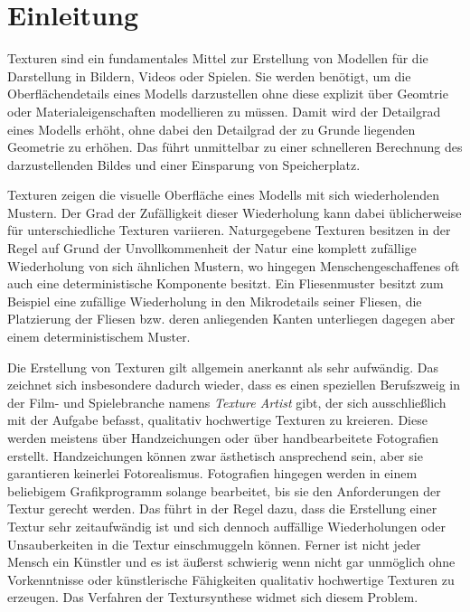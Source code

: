 \section{Einleitung}

Texturen sind ein fundamentales Mittel zur Erstellung von Modellen für die Darstellung in Bildern, Videos oder Spielen.
Sie werden benötigt, um die Oberflächendetails eines Modells darzustellen ohne diese explizit über Geomtrie oder Materialeigenschaften modellieren zu müssen.
Damit wird der Detailgrad eines Modells erhöht, ohne dabei den Detailgrad der zu Grunde liegenden Geometrie zu erhöhen.
Das führt unmittelbar zu einer schnelleren Berechnung des darzustellenden Bildes und einer Einsparung von Speicherplatz.

Texturen zeigen die visuelle Oberfläche eines Modells mit sich wiederholenden Mustern.
Der Grad der Zufälligkeit dieser Wiederholung kann dabei üblicherweise für unterschiedliche Texturen variieren.
Naturgegebene Texturen besitzen in der Regel auf Grund der Unvollkommenheit der Natur eine komplett zufällige Wiederholung von sich ähnlichen Mustern, wo hingegen Menschengeschaffenes oft auch eine deterministische Komponente besitzt.
Ein Fliesenmuster besitzt zum Beispiel eine zufällige Wiederholung in den Mikrodetails seiner Fliesen, die Platzierung der Fliesen bzw. deren anliegenden Kanten unterliegen dagegen aber einem deterministischem Muster.

Die Erstellung von Texturen gilt allgemein anerkannt als sehr aufwändig.
Das zeichnet sich insbesondere dadurch wieder, dass es einen speziellen Berufszweig in der Film- und Spielebranche namens \emph{Texture Artist} gibt, der sich ausschließlich mit der Aufgabe befasst, qualitativ hochwertige Texturen zu kreieren.
Diese werden meistens über Handzeichungen oder über handbearbeitete Fotografien erstellt.
Handzeichungen können zwar ästhetisch ansprechend sein, aber sie garantieren keinerlei Fotorealismus.
Fotografien hingegen werden in einem beliebigem Grafikprogramm solange bearbeitet, bis sie den Anforderungen der Textur gerecht werden.
Das führt in der Regel dazu, dass die Erstellung einer Textur sehr zeitaufwändig ist und sich dennoch auffällige Wiederholungen oder Unsauberkeiten in die Textur einschmuggeln können.
Ferner ist nicht jeder Mensch ein Künstler und es ist äußerst schwierig wenn nicht gar unmöglich ohne Vorkenntnisse oder künstlerische Fähigkeiten qualitativ hochwertige Texturen zu erzeugen.
Das Verfahren der Textursynthese widmet sich diesem Problem.

